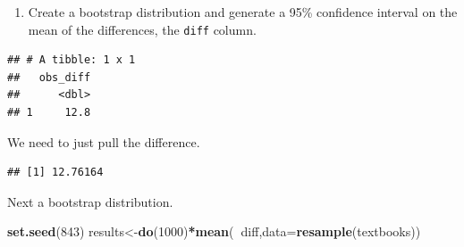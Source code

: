 \documentclass[
]{book}
\newenvironment{Shaded}{\begin{snugshade}}{\end{snugshade}}
\newcommand{\DataTypeTok}[1]{\textcolor[rgb]{0.13,0.29,0.53}{#1}}
\newcommand{\DecValTok}[1]{\textcolor[rgb]{0.00,0.00,0.81}{#1}}
\newcommand{\KeywordTok}[1]{\textcolor[rgb]{0.13,0.29,0.53}{\textbf{#1}}}
\newcommand{\NormalTok}[1]{#1}
\newcommand{\OperatorTok}[1]{\textcolor[rgb]{0.81,0.36,0.00}{\textbf{#1}}}
\newcommand{\StringTok}[1]{\textcolor[rgb]{0.31,0.60,0.02}{#1}}
\providecommand{\tightlist}{%
  \setlength{\itemsep}{0pt}\setlength{\parskip}{0pt}}
\begin{document}
\begin{enumerate}
\def\labelenumi{\alph{enumi}.}
\setcounter{enumi}{5}
\tightlist
\item
  Create a bootstrap distribution and generate a 95\% confidence interval on the mean of the differences, the \texttt{diff} column.
\end{enumerate}

\begin{Shaded}
\end{Shaded}

\begin{verbatim}
## # A tibble: 1 x 1
##   obs_diff
##      <dbl>
## 1     12.8
\end{verbatim}

We need to just pull the difference.

\begin{Shaded}
\end{Shaded}

\begin{verbatim}
## [1] 12.76164
\end{verbatim}

Next a bootstrap distribution.

\begin{Shaded}
\begin{Highlighting}[]
\KeywordTok{set.seed}\NormalTok{(}\DecValTok{843}\NormalTok{)}
\NormalTok{results<-}\KeywordTok{do}\NormalTok{(}\DecValTok{1000}\NormalTok{)}\OperatorTok{*}\KeywordTok{mean}\NormalTok{(}\OperatorTok{~}\NormalTok{diff,}\DataTypeTok{data=}\KeywordTok{resample}\NormalTok{(textbooks))}
\end{Highlighting}
\end{Shaded}
\end{document}

